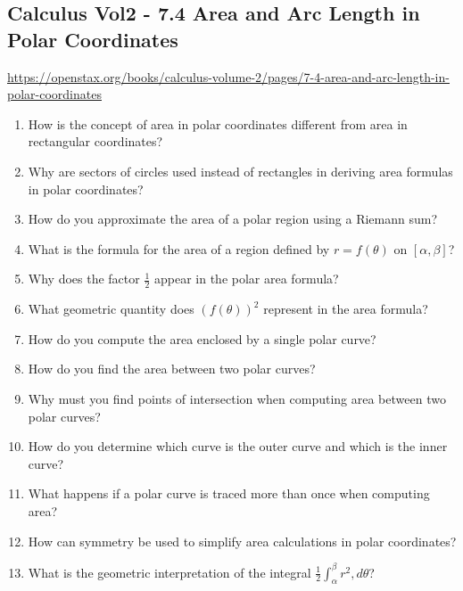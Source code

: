 \subsection{Calculus Vol2 - 7.4 Area and Arc Length in Polar Coordinates}

\url{https://openstax.org/books/calculus-volume-2/pages/7-4-area-and-arc-length-in-polar-coordinates}

\begin{enumerate}

\item How is the concept of area in polar coordinates different from area in rectangular coordinates?

\item Why are sectors of circles used instead of rectangles in deriving area formulas in polar coordinates?

\item How do you approximate the area of a polar region using a Riemann sum?

\item What is the formula for the area of a region defined by $r = f(\theta)$ on $[\alpha, \beta]$?

\item Why does the factor $\frac{1}{2}$ appear in the polar area formula?

\item What geometric quantity does $(f(\theta))^2$ represent in the area formula?

\item How do you compute the area enclosed by a single polar curve?

\item How do you find the area between two polar curves?

\item Why must you find points of intersection when computing area between two polar curves?

\item How do you determine which curve is the outer curve and which is the inner curve?

\item What happens if a polar curve is traced more than once when computing area?

\item How can symmetry be used to simplify area calculations in polar coordinates?

\item What is the geometric interpretation of the integral $\frac{1}{2}\int_\alpha^\beta r^2,d\theta$?


\end{enumerate}
